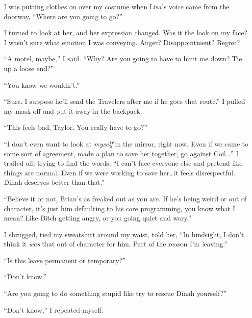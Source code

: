 I was putting clothes on over my costume when Lisa's voice came from the doorway, ``Where are you going to go?''



I turned to look at her, and her expression changed.  Was it the look on my face?  I wasn't sure what emotion I was conveying.  Anger?  Disappointment?  Regret?



``A motel, maybe,'' I said.  ``Why?  Are you going to have to hunt me down?  Tie up a loose end?''



``You know we wouldn't.''



``Sure.  I suppose he'll send the Travelers after me if he goes that route.''  I pulled my mask off and put it away in the backpack.



``This feels bad, Taylor.  You really have to go?''



``I don't even want to look at \emph{myself} in the mirror, right now.  Even if we came to some sort of agreement, made a plan to save her together, go against Coil\ldots'' I trailed off, trying to find the words, ``I can't face everyone else and pretend like things are normal.  Even if we were working to save her\ldots it feels disrespectful.  Dinah deserves better than that.''



``Believe it or not, Brian's as freaked out as you are.  If he's being weird or out of character, it's just him defaulting to his core programming, you know what I mean?  Like Bitch getting angry, or you going quiet and wary.''



I shrugged, tied my sweatshirt around my waist, told her, ``In hindsight, I don't think it \emph{was} that out of character for him.  Part of the reason I'm leaving.''



``Is this leave permanent or temporary?''



``Don't know.''



``Are you going to do something stupid like try to rescue Dinah yourself?''



``Don't know,'' I repeated myself.



